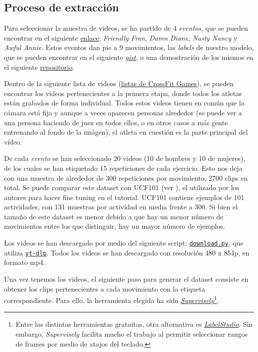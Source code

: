 \subsection{Proceso de extracción}

Para seleccionar la muestra de videos, se ha partido de 4 \textit{eventos}, que se pueden encontrar en el siguiente \href{https://games.crossfit.com/workouts/games/2020}{enlace}: \textit{Friendly Fran}, \textit{Damn Diane}, \textit{Nasty Nancy} y \textit{Awful Annie}. Estos eventos dan pie a 9 movimientos, las \textit{labels} de nuestro modelo, que se pueden encontrar en el siguiente \href{https://gist.github.com/plaguss/58091caefee6acb39ae51cbc241b3cf9/raw/labels.txt}{\textit{gist}}, o una demostración de los mismos en el siguiente \href{https://github.com/plaguss/tfm-misc}{repositorio}.

Dentro de la siguiente lista de videos (\href{https://www.youtube.com/c/CrossFitGamesTV/playlists}{listas de CrossFit Games}), se pueden encontrar los videos pertenecientes a la primera etapa, donde todos los atletas están grabados de forma individual. Todos estos videos tienen en común que la cámara está fija y aunque a veces aparecen personas alrededor (se puede ver a una persona haciendo de juez en todos ellos, o en otros casos a más gente entrenando al fondo de la imágen), el atleta en cuestión es la parte principal del vídeo.

De cada \textit{evento} se han seleccionado 20 videos (10 de hombres y 10 de mujeres), de los cuales se han etiquetado 15 repeticiones de cada ejercicio. Esto nos deja con una muestra de alrededor de 300 repeticiones por movimiento, 2700 clips en total. Se puede comparar este dataset con UCF101 (ver \cite{UCF101}), el utilizado por los autores para hacer fine tuning en el tutorial. UCF101 contiene ejemplos de 101 actividades, con 131 muestras por actividad en media frente a 300. Si bien el tamaño de este dataset es menor debido a que hay un menor número de movimientos entre los que distinguir, hay un mayor número de ejemplos.

Los videos se han descargado por medio del siguiente script: \href{https://github.com/plaguss/tfm-misc/blob/main/scripts/download.py}{\texttt{download.py}}, que utiliza \href{https://github.com/yt-dlp/yt-dlp}{\texttt{yt-dlp}}. Todos los vídeos se han descargado con resolución 480 x 854p, en formato mp4.

Una vez tenemos los videos, el siguiente paso para generar el dataset consiste en obtener los clips pertenecientes a cada movimiento con la etiqueta correspondiente. Para ello, la herramienta elegida ha sido \href{https://supervise.ly/}{\textit{Supervisely}}\footnote{Entre las distintas herramientas gratuitas, otra alternativa es \href{https://labelstud.io/}{\textit{LabelStudio}}. Sin embargo, \textit{Supervisely} facilita mucho el trabajo al permitir seleccionar rangos de frames por medio de atajos del teclado.}.

